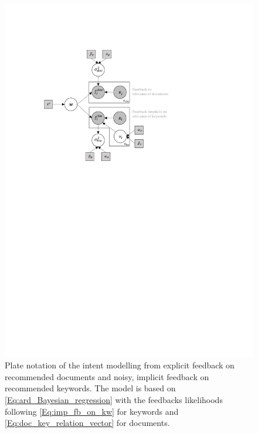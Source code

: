 \documentclass[dissertation,math,vertlayout,pdfa,colorlinks]{aaltoseries}
\begin{document}
\begin{figure}
	\centering
	\includegraphics[width=0.80\linewidth]{Figures/Plate_diagram_intent_imp.pdf}
	\caption{Plate notation of the intent modelling from explicit feedback on recommended documents and noisy, implicit feedback on recommended keywords. The model is based on \ref{Eq:ard_Bayesian_regression} with the feedbacks likelihoods following \ref{Eq:imp_fb_on_kw} for keywords and \ref{Eq:doc_key_relation_vector} for documents.}
	\label{fig:Plate_intent_imp}
\end{figure}

   
\end{document}
